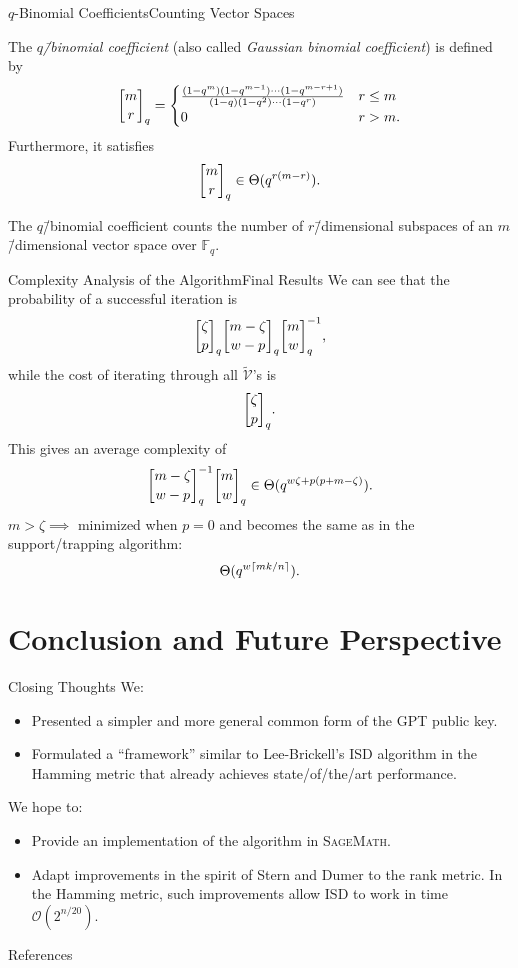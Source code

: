 \documentclass[usepdftitle=false]{beamer}
\newcommand*{\FF}{\ensuremath{\mathbb{F}}}%
\newcommand*{\BigOh}{\mathcal{O}}%
\DeclarePairedDelimiter{\ceil}{\lceil}{\rceil}%
\DeclareRobustCommand{\qbinom}{\genfrac[]{0pt}{}}%
\begin{document}
\begin{frame}{\(q\)-Binomial Coefficients}{Counting Vector Spaces}
  \begin{definition}
    The \emph{\(q\)\=/binomial coefficient} (also called
    \emph{Gaussian binomial coefficient}) is defined by
    \[
      \qbinom{m}{r}_q =
      \begin{cases}
        \frac{(1 - q^m) (1 - q^{m - 1}) \cdots (1 - q^{m - r + 1})}{(1 - q) (1 - q^2) \cdots (1 - q^r)} & r \le m\\
        0 & r > m\text.
      \end{cases}
    \]
    Furthermore, it satisfies
    \[
      \qbinom{m}{r}_q \in \Theta(q^{r (m - r)})\text.
    \]
  \end{definition}
  The \(q\)\=/binomial coefficient counts the \alert{number of
    \(r\)\=/dimensional subspaces of an \(m\)\=/dimensional vector
    space over \(\FF_q\)}.
\end{frame}

\begin{frame}{Complexity Analysis of the Algorithm}{Final Results}
  We can see that the probability of a successful iteration is
  \[
    \qbinom{\zeta}{p}_q \qbinom{m - \zeta}{w - p}_q \qbinom{m}{w}_q^{-1}\text,
  \]
  while the cost of iterating through all \(\tilde{\mathcal{V}}\)'s is
  \[
    \qbinom{\zeta}{p}_q\text.
  \]
  This gives an average complexity of
  \[
    \qbinom{m - \zeta}{w - p}_q^{-1} \qbinom{m}{w}_q \in \Theta(q^{w
      \zeta + p (p + m - \zeta)})\text.
  \]
  \(m > \zeta \implies\) minimized when \alert{\(p = 0\)} and becomes
  the same as in the support\-/trapping algorithm:
  \[
    \Theta(q^{w \ceil{m k / {n}}}).
  \]
\end{frame}

\section{Conclusion and Future Perspective}

\begin{frame}{Closing Thoughts}
  We:
  \begin{itemize}
  \item Presented a simpler and more general common form of the GPT
    public key.
  \item Formulated a \enquote{framework} similar to Lee\--Brickell's
    ISD algorithm in the Hamming metric that already achieves
    state\-/of\-/the\-/art performance.
  \end{itemize}
  We hope to:
  \begin{itemize}
  \item Provide an implementation of the algorithm in
    \textsc{SageMath}.
  \item Adapt improvements in the spirit of Stern and Dumer to the
    rank metric.  In the Hamming metric, such improvements allow ISD
    to work in time \(\BigOh(2^{n / {20}})\).
  \end{itemize}
\end{frame}

\begin{frame}[allowframebreaks]{References}
  \printbibliography[heading=none]
\end{frame}

\begin{frame}
  \begin{center}
    \huge%
  \end{center}
\end{frame}
\end{document}
